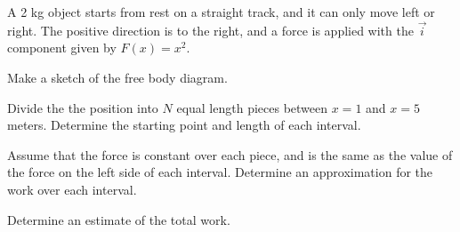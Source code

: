 \begin{problem}
  \item A 2 kg object starts from rest on a straight track, and it can
    only move left or right. The positive direction is to the right, and
    a force is applied with the $\vec{i}$ component given by $F(x)=x^2$.




    \begin{subproblem}
      \item Make a sketch of the free body diagram.
        \vspace{4em}
      \item Divide the the position into $N$ equal length pieces between $x=1$ and $x=5$ meters. Determine the starting point and length of each interval.
      \vspace{4em}
      \item Assume that the force is constant over each piece, and is the same as the value of the force on the left side of each interval.
      Determine an approximation for the work over each interval.
      \vfill
      \item Determine an estimate of the total work.
        \vfill
    \end{subproblem}

\end{problem}


\postClass


